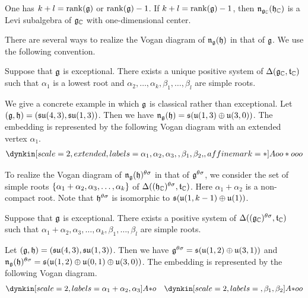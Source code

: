 \begin{proposition}
	One has $k+l = \operatorname{rank}(\mathfrak{g})$ or $\operatorname{rank}(\mathfrak{g}) - 1$.
	If $k+l=\operatorname{rank}(\mathfrak{g}) - 1$, then $\mathfrak{n}_{\mathfrak{g}_{\mathbb{C}}}(\mathfrak{h}_{\mathbb{C}})$ is a Levi subalgebra of $\mathfrak{g}_{\mathbb{C}}$ with one-dimensional center.
\end{proposition}
	
There are several ways to realize the Vogan diagram of $\mathfrak{n}_{\mathfrak{g}}(\mathfrak{h})$ in that of $\mathfrak{g}$.
We use the following convention.

\begin{proposition}
	Suppose that $\mathfrak{g}$ is exceptional.
	There exists a unique positive system of $\Delta(\mathfrak{g}_{\mathbb{C}}, \mathfrak{t}_{\mathbb{C}})$ such that $\alpha_1$ is a lowest root and $\alpha_2, \ldots, \alpha_k, \beta_1, \ldots, \beta_l$ are simple roots.
\end{proposition}

\begin{example}
	We give a concrete example in which $\mathfrak{g}$ is classical rather than exceptional.
	Let $(\mathfrak{g}, \mathfrak{h}) = (\mathfrak{su}(4,3), \mathfrak{su}(1,3))$.
	Then we have $\mathfrak{n}_{\mathfrak{g}}(\mathfrak{h}) = \mathfrak{s}(\mathfrak{u}(1,3) \oplus \mathfrak{u}(3, 0))$.
	The embedding is represented by the following Vogan diagram with an extended vertex $\alpha_1$.
	\begin{align*}
		\dynkin[scale=2, extended, labels={\alpha_1, \alpha_2, \alpha_3, , \beta_1, \beta_2, }, affine mark=*]{A}{oo*ooo}
	\end{align*}
\end{example}

To realize the Vogan diagram of $\mathfrak{n}_{\mathfrak{g}}(\mathfrak{h})^{\theta\sigma}$ in that of $\mathfrak{g}^{\theta\sigma}$, we consider the set of simple roots $\left\{\alpha_1 + \alpha_2, \alpha_3, \ldots, \alpha_k \right\}$ of $\Delta((\mathfrak{h}_{\mathbb{C}})^{\theta\sigma}, \mathfrak{t}_{\mathbb{C}})$.
Here $\alpha_1 + \alpha_2$ is a non-compact root.
Note that $\mathfrak{h}^{\theta\sigma}$ is isomorphic to $\mathfrak{s}(\mathfrak{u}(1, k-1)\oplus \mathfrak{u}(1))$.

\begin{proposition} \label{prop:EmbeddingVoganAssociatedPair}
	Suppose that $\mathfrak{g}$ is exceptional.
	There exists a positive system of $\Delta((\mathfrak{g}_{\mathbb{C}})^{\theta\sigma}, \mathfrak{t}_{\mathbb{C}})$ such that $\alpha_1 + \alpha_2, \alpha_3, \ldots, \alpha_k, \beta_1, \ldots, \beta_l$ are simple roots.
\end{proposition}

\begin{example}
	Let $(\mathfrak{g}, \mathfrak{h}) = (\mathfrak{su}(4,3), \mathfrak{su}(1,3))$.
	Then we have $\mathfrak{g}^{\theta\sigma} = \mathfrak{s}(\mathfrak{u}(1,2) \oplus \mathfrak{u}(3, 1))$ and $\mathfrak{n}_{\mathfrak{g}}(\mathfrak{h})^{\theta\sigma} = \mathfrak{s}(\mathfrak{u}(1, 2) \oplus \mathfrak{u}(0, 1) \oplus \mathfrak{u}(3, 0))$.
	The embedding is represented by the following Vogan diagram.
	\begin{align*}
		\dynkin[scale=2, labels={\alpha_1 + \alpha_2, \alpha_3}]{A}{*o}\quad 
		\dynkin[scale=2, labels={, \beta_1, \beta_2}]{A}{*oo}
	\end{align*}
\end{example}

